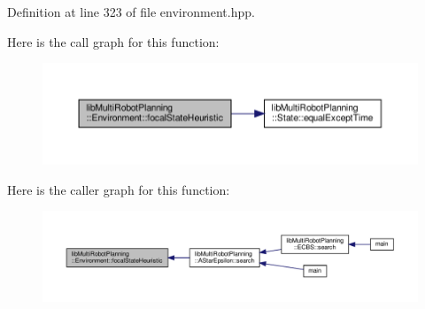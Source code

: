 Definition at line 323 of file environment.\+hpp.

Here is the call graph for this function\+:
\nopagebreak
\begin{figure}[H]
\begin{center}
\leavevmode
\includegraphics[width=350pt]{classlib_multi_robot_planning_1_1_environment_ac76b52b63f0bfbdde9dc6fed2520a0b6_cgraph}
\end{center}
\end{figure}
Here is the caller graph for this function\+:
\nopagebreak
\begin{figure}[H]
\begin{center}
\leavevmode
\includegraphics[width=350pt]{classlib_multi_robot_planning_1_1_environment_ac76b52b63f0bfbdde9dc6fed2520a0b6_icgraph}
\end{center}
\end{figure}
\mbox{\label{classlib_multi_robot_planning_1_1_environment_adf9e6ca87f829fd0fdc185d85b29bb4e}} 
